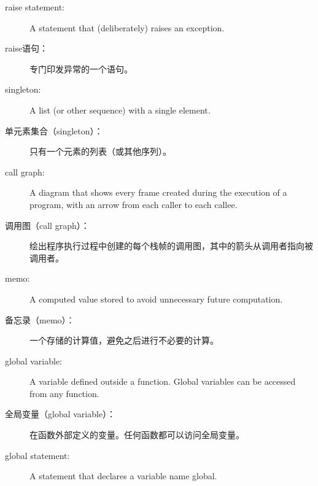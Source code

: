 \begin{description}

\item[raise statement:]  A statement that (deliberately) raises an exception.

  

\item[raise语句：]  专门印发异常的一个语句。

  

\item[singleton:] A list (or other sequence) with a single element.

\item[单元素集合（singleton）：] 只有一个元素的列表（或其他序列）。

\item[call graph:] A diagram that shows every frame created during
the execution of a program, with an arrow from each caller to
each callee.

  

\item[调用图（call graph）：] 绘出程序执行过程中创建的每个栈帧的调用图，其中的箭头从调用者指向被调用者。

  

\item[memo:] A computed value stored to avoid unnecessary future
computation.


\item[备忘录（memo）：] 一个存储的计算值，避免之后进行不必要的计算。


\item[global variable:]  A variable defined outside a function.  Global
variables can be accessed from any function.


\item[全局变量（global variable）：]  在函数外部定义的变量。任何函数都可以访问全局变量。


\item[global statement:]  A statement that declares a variable name
global.

  


\end{description}
